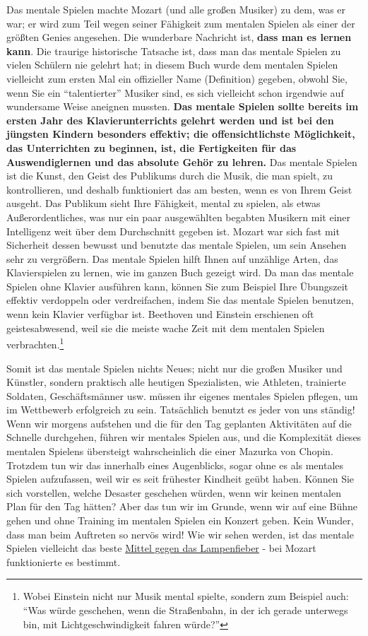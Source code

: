 Das mentale Spielen machte Mozart (und alle großen Musiker) zu dem, was er war; er wird zum Teil wegen seiner Fähigkeit zum mentalen Spielen als einer der größten Genies angesehen.
Die wunderbare Nachricht ist, \textbf{dass man es lernen kann}.
Die traurige historische Tatsache ist, dass man das mentale Spielen zu vielen Schülern nie gelehrt hat;
in diesem Buch wurde dem mentalen Spielen vielleicht zum ersten Mal ein offizieller Name (Definition) gegeben, obwohl Sie, wenn Sie ein \enquote{talentierter} Musiker sind, es sich vielleicht schon irgendwie auf wundersame Weise aneignen mussten.
\textbf{Das mentale Spielen sollte bereits im ersten Jahr des Klavierunterrichts gelehrt werden und ist bei den jüngsten Kindern besonders effektiv;
die offensichtlichste Möglichkeit, das Unterrichten zu beginnen, ist, die Fertigkeiten für das Auswendiglernen und das absolute Gehör zu lehren.}
Das mentale Spielen ist die Kunst, den Geist des Publikums durch die Musik, die man spielt, zu kontrollieren, und deshalb funktioniert das am besten, wenn es von Ihrem Geist ausgeht.
Das Publikum sieht Ihre Fähigkeit, mental zu spielen, als etwas 
Außerordentliches, was nur ein paar ausgewählten begabten Musikern mit einer Intelligenz weit über dem Durchschnitt gegeben ist.
Mozart war sich fast mit Sicherheit dessen bewusst und benutzte das mentale Spielen, um sein Ansehen sehr zu vergrößern.
Das mentale Spielen hilft Ihnen auf unzählige Arten, das Klavierspielen zu lernen, wie im ganzen Buch gezeigt wird.
Da man das mentale Spielen ohne Klavier ausführen kann, können Sie zum Beispiel Ihre Übungszeit effektiv verdoppeln oder verdreifachen, 
indem Sie das mentale Spielen benutzen, wenn kein Klavier verfügbar ist.
Beethoven und Einstein erschienen oft geistesabwesend, weil sie die meiste wache Zeit mit dem mentalen Spielen verbrachten.\footnote{Wobei Einstein nicht nur Musik mental spielte, sondern zum Beispiel auch: \enquote{Was würde geschehen, wenn die Straßenbahn, in der ich gerade unterwegs bin, mit Lichtgeschwindigkeit fahren würde?}}

Somit ist das mentale Spielen nichts Neues;
nicht nur die großen Musiker und Künstler, sondern praktisch alle heutigen Spezialisten, wie Athleten, trainierte Soldaten, Geschäftsmänner usw. müssen ihr eigenes mentales Spielen pflegen, um im Wettbewerb erfolgreich zu sein.
Tatsächlich benutzt es jeder von uns ständig!
Wenn wir morgens aufstehen und die für den Tag geplanten Aktivitäten auf die Schnelle durchgehen, führen wir mentales Spielen aus, und die Komplexität dieses mentalen Spielens übersteigt wahrscheinlich die einer Mazurka von Chopin.
Trotzdem tun wir das innerhalb eines Augenblicks, sogar ohne es als mentales Spielen aufzufassen, weil wir es seit frühester Kindheit geübt haben.
Können Sie sich vorstellen, welche Desaster geschehen würden, wenn wir keinen mentalen Plan für den Tag hätten?
Aber das tun wir im Grunde, wenn wir auf eine Bühne gehen und ohne Training im mentalen Spielen ein Konzert geben.
Kein Wunder, dass man beim Auftreten so nervös wird!
Wie wir sehen werden, ist das mentale Spielen vielleicht das beste \hyperlink{c1iii15}{Mittel gegen das Lampenfieber} - bei Mozart funktionierte es bestimmt.


